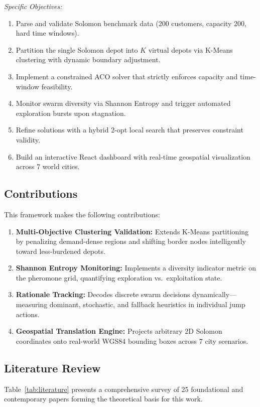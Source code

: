 \documentclass[10pt,conference]{IEEEtran}
\begin{document}
\textit{Specific Objectives:}
\begin{enumerate}
    \item Parse and validate Solomon benchmark data (200 customers, capacity 200, hard time windows).
    \item Partition the single Solomon depot into $K$ virtual depots via K-Means clustering with dynamic boundary adjustment.
    \item Implement a constrained ACO solver that strictly enforces capacity and time-window feasibility.
    \item Monitor swarm diversity via Shannon Entropy and trigger automated exploration bursts upon stagnation.
    \item Refine solutions with a hybrid 2-opt local search that preserves constraint validity.
    \item Build an interactive React dashboard with real-time geospatial visualization across 7 world cities.
\end{enumerate}

\subsection{Contributions}
This framework makes the following contributions:
\begin{enumerate}
    \item \textbf{Multi-Objective Clustering Validation:} Extends K-Means partitioning by penalizing demand-dense regions and shifting border nodes intelligently toward less-burdened depots.
    \item \textbf{Shannon Entropy Monitoring:} Implements a diversity indicator metric on the pheromone grid, quantifying exploration vs.\ exploitation state.
    \item \textbf{Rationale Tracking:} Decodes discrete swarm decisions dynamically---measuring dominant, stochastic, and fallback heuristics in individual jump actions.
    \item \textbf{Geospatial Translation Engine:} Projects arbitrary 2D Solomon coordinates onto real-world WGS84 bounding boxes across 7 city scenarios.
\end{enumerate}

\subsection{Literature Review}
Table~\ref{tab:literature} presents a comprehensive survey of 25 foundational and contemporary papers forming the theoretical basis for this work.
\end{document}
